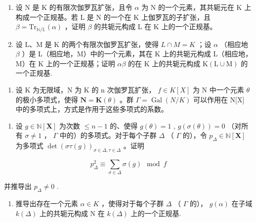 \begin{enumerate}
\def\labelenumi{\alph{enumi})}
\setcounter{enumi}{1}
\tightlist
\item
  设 N 是 K 的有限次伽罗瓦扩张，且令 \(\alpha\) 为 N 的一个元素，其共轭元在 K 上构成一个正规基。若 L 是 N 的一个在 K 上伽罗瓦的子扩张，且 \(\beta = \mathrm{Tr}_{\mathbb{N}/\mathbb{L}}(\alpha)\) ，证明 \(\beta\) 的共轭元构成 L 在 K 上的一个正规基。
\item
  设 L、M 是 K 的两个有限次伽罗瓦扩张，使得 \(L \cap M = K\) ；设 \(\alpha\) （相应地 \(\beta\) ）是 L（相应地，M）中的一个元素，其在 K 上的共轭元构成 L（相应地，M）在 K 上的一个正规基；证明 \(\alpha\beta\) 的在 K 上的共轭元构成 \(\mathrm{K}(\mathrm{L} \cup \mathrm{M})\) 的一个正规基.
\end{enumerate}

\begin{enumerate}
\def\labelenumi{\arabic{enumi})}
\setcounter{enumi}{11}
\tightlist
\item
  设 K 为无限域，N 为 K 的 n 次伽罗瓦扩张， \(f \in K[X]\) 为 N 中一个元素 \(\theta\) 的极小多项式，使得 \(\mathbf{N} = \mathbf{K}(\theta)\) 。群 \(\Gamma = \operatorname{Gal}(N/K)\) 可以作用在 N{[}X{]} 中的多项式上，方式是作用于这些多项式的系数。
\end{enumerate}

\begin{enumerate}
\def\labelenumi{\alph{enumi})}
\tightlist
\item
  设 \(g \in \mathbb{N}[\mathbf{X}]\) 为次数 \(\leqslant n - 1\) 的、使得 \(g(\theta) = 1\) , \(g(\sigma(\theta)) = 0\) （对所有 \(\sigma \neq 1\) ， \(\Gamma\) 中的）的多项式。对于每个子群 \(\Delta\) （ \(\Gamma\) 的），令 \(p_{\Delta} \in \mathbb{N}[\mathbf{X}]\) 为多项式 \(\det(\sigma\tau(g))_{\sigma \in \Delta, \tau \in \Delta}\) 。证明
\end{enumerate}

\[
p _ {\Delta} ^ {2} \equiv \sum_ {\sigma \in \Delta} \sigma (g) \mod f
\]

并推导出 \(p_{\Delta} \neq 0\) .

\begin{enumerate}
\def\labelenumi{\alph{enumi})}
\setcounter{enumi}{1}
\tightlist
\item
  推导出存在一个元素 \(\alpha \in K\) ，使得对于每个子群 \(\Delta\) （ \(\Gamma\) 的）， \(g(\alpha)\) 在子域 \(k(\Delta)\) 上的共轭元构成 N 在 \(k(\Delta)\) 上的一个正规基.
\end{enumerate}

